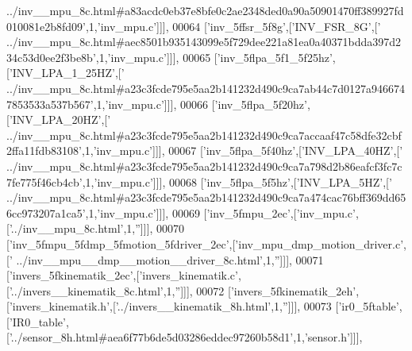 \begin{DoxyCode}
{      ../inv\_\_mpu\_8c.html#a83acdc0eb37e8bfe0c2ae2348ded0a90a50901470ff389927fd010081e2b8fd09'},1,\textcolor{stringliteral}{'inv\_mpu.c'}]]],
00064   [\textcolor{stringliteral}{'inv\_5ffsr\_5f8g'},[\textcolor{stringliteral}{'INV\_FSR\_8G'},[\textcolor{stringliteral}{'
      ../inv\_\_mpu\_8c.html#aec8501b935143099e5f729dee221a81ea0a40371bdda397d234c53d0ee2f3be8b'},1,\textcolor{stringliteral}{'inv\_mpu.c'}]]],
00065   [\textcolor{stringliteral}{'inv\_5flpa\_5f1\_5f25hz'},[\textcolor{stringliteral}{'INV\_LPA\_1\_25HZ'},[\textcolor{stringliteral}{'
      ../inv\_\_mpu\_8c.html#a23c3fcde795e5aa2b141232d490c9ca7ab44c7d0127a9466747853533a537b567'},1,\textcolor{stringliteral}{'inv\_mpu.c'}]]],
00066   [\textcolor{stringliteral}{'inv\_5flpa\_5f20hz'},[\textcolor{stringliteral}{'INV\_LPA\_20HZ'},[\textcolor{stringliteral}{'
      ../inv\_\_mpu\_8c.html#a23c3fcde795e5aa2b141232d490c9ca7accaaf47c58dfe32cbf2ffa11fdb83108'},1,\textcolor{stringliteral}{'inv\_mpu.c'}]]],
00067   [\textcolor{stringliteral}{'inv\_5flpa\_5f40hz'},[\textcolor{stringliteral}{'INV\_LPA\_40HZ'},[\textcolor{stringliteral}{'
      ../inv\_\_mpu\_8c.html#a23c3fcde795e5aa2b141232d490c9ca7a798d2b86eafcf3fc7c7fe775f46cb4cb'},1,\textcolor{stringliteral}{'inv\_mpu.c'}]]],
00068   [\textcolor{stringliteral}{'inv\_5flpa\_5f5hz'},[\textcolor{stringliteral}{'INV\_LPA\_5HZ'},[\textcolor{stringliteral}{'
      ../inv\_\_mpu\_8c.html#a23c3fcde795e5aa2b141232d490c9ca7a474cac76bff369dd656cc973207a1ca5'},1,\textcolor{stringliteral}{'inv\_mpu.c'}]]],
00069   [\textcolor{stringliteral}{'inv\_5fmpu\_2ec'},[\textcolor{stringliteral}{'inv\_mpu.c'},[\textcolor{stringliteral}{'../inv\_\_mpu\_8c.html'},1,\textcolor{stringliteral}{''}]]],
00070   [\textcolor{stringliteral}{'inv\_5fmpu\_5fdmp\_5fmotion\_5fdriver\_2ec'},[\textcolor{stringliteral}{'inv\_mpu\_dmp\_motion\_driver.c'},[\textcolor{stringliteral}{'
      ../inv\_\_mpu\_\_dmp\_\_motion\_\_driver\_8c.html'},1,\textcolor{stringliteral}{''}]]],
00071   [\textcolor{stringliteral}{'invers\_5fkinematik\_2ec'},[\textcolor{stringliteral}{'invers\_kinematik.c'},[\textcolor{stringliteral}{'../invers\_\_kinematik\_8c.html'},1,\textcolor{stringliteral}{''}]]],
00072   [\textcolor{stringliteral}{'invers\_5fkinematik\_2eh'},[\textcolor{stringliteral}{'invers\_kinematik.h'},[\textcolor{stringliteral}{'../invers\_\_kinematik\_8h.html'},1,\textcolor{stringliteral}{''}]]],
00073   [\textcolor{stringliteral}{'ir0\_5ftable'},[\textcolor{stringliteral}{'IR0\_table'},[\textcolor{stringliteral}{'../sensor\_8h.html#aea6f77b6de5d03286eddec97260b58d1'},1,\textcolor{stringliteral}{'sensor.h'}]]],

\end{DoxyCode}
